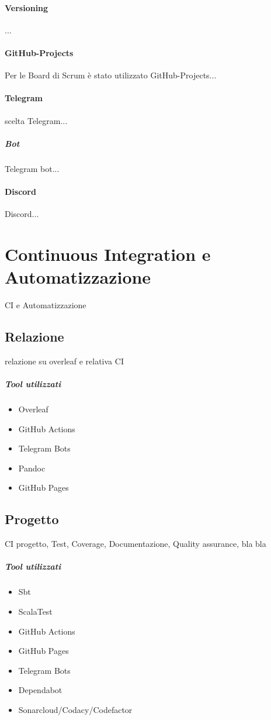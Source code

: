     \paragraph{Versioning}
    ...
    
    \paragraph{GitHub-Projects}
    Per le Board di Scrum è stato utilizzato GitHub-Projects...
    
    \paragraph{Telegram}
    scelta Telegram...
        \subparagraph{Bot} 
        Telegram bot...
    
    \paragraph{Discord}
    Discord... 

\section{Continuous Integration e Automatizzazione}
\label{chap:CI}
CI e Automatizzazione
    \subsection{Relazione}
        relazione su overleaf e relativa CI
        
        \subparagraph{Tool utilizzati}
        \begin{itemize}
            \item Overleaf
            \item GitHub Actions
            \item Telegram Bots
            \item Pandoc
            \item GitHub Pages
        \end{itemize}

    \subsection{Progetto}
        CI progetto, Test, Coverage, Documentazione, Quality assurance, bla bla
        
        \subparagraph{Tool utilizzati}
        \begin{itemize}
            \item Sbt
            \item ScalaTest
            \item GitHub Actions
            \item GitHub Pages
            \item Telegram Bots
            \item Dependabot
            \item Sonarcloud/Codacy/Codefactor
        \end{itemize}








